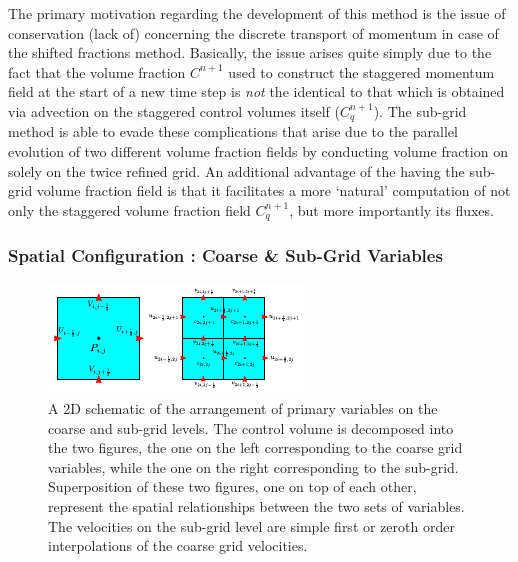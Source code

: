 The primary motivation regarding the development of this 
method is the issue of conservation (lack of) concerning 
the discrete transport of momentum in case of the shifted fractions method.     
Basically, the issue arises quite simply due to the fact that the volume fraction 
$C^{n+1}$ used to construct the staggered momentum field at the start of a 
new time step is \textit{not} the identical to that which is obtained 
via advection on the staggered control volumes itself ($C_{q}^{n+1}$). 
The sub-grid method is able to evade these complications that arise due to
the parallel evolution of two different volume fraction fields by conducting 
volume fraction on solely on the twice refined grid.  
An additional advantage of the having the sub-grid volume fraction field is that 
it facilitates a more `natural' computation of not only the staggered 
volume fraction field $C^{n+1}_q$, but more importantly its fluxes. 



\subsubsection*{Spatial Configuration : Coarse \& Sub-Grid Variables}

\begin{figure}[h!]
\includegraphics[width = \textwidth]{plots/sub_grid.pdf} 
\centering
\caption{A 2D schematic of the arrangement of primary variables 
on the coarse and sub-grid levels. 
The control volume is decomposed into the two figures, the one
on the left corresponding to the coarse grid variables, while the 
one on the right corresponding to the sub-grid. 
Superposition of these two figures, one on top of each other,
represent the spatial relationships between the two sets of variables.
The velocities on the sub-grid level are simple first 
or zeroth order interpolations of the coarse grid velocities.
}
\label{sub_grid}
\end{figure}

